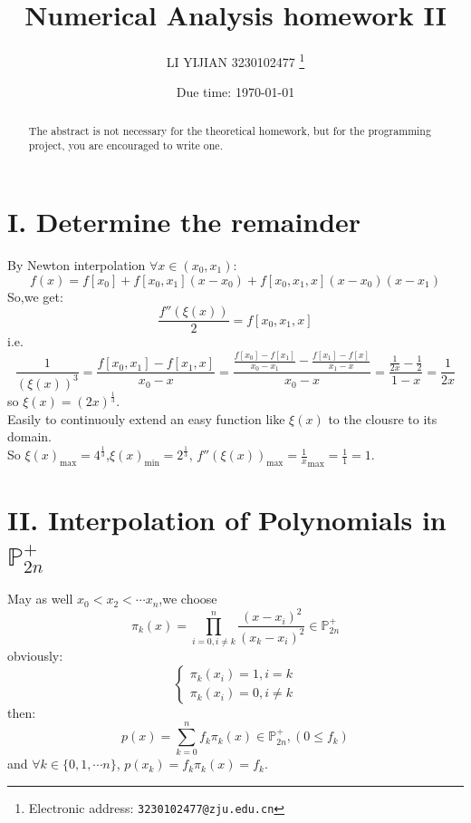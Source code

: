 \documentclass[a4paper]{article}
\begin{document}
\title{Numerical Analysis homework II}

\author{LI YIJIAN 3230102477
  \thanks{Electronic address: \texttt{3230102477@zju.edu.cn}}}


\date{Due time: \today}

\maketitle

\begin{abstract}
    The abstract is not necessary for the theoretical homework, 
    but for the programming project, 
    you are encouraged to write one.      
\end{abstract}





\section*{I. Determine the remainder}
By Newton interpolation $\forall x \in (x_0,x_1)$:
\[
f(x) = f[x_0] + f[x_0,x_1](x-x_0) + f[x_0,x_1,x](x-x_0)(x-x_1)
\]
So,we get:
\[
\frac{f''(\xi(x))}{2} = f[x_0,x_1,x]
\]
i.e.
\[
\frac{1}{(\xi(x))^3} = \frac{f[x_0,x_1] - f[x_1,x]}{x_0 - x} = 
\frac{\frac{f[x_0] - f[x_1]}{x_0 - x_1}-\frac{f[x_1] - f[x]}{x_1 - x}}{{x_0 - x}}
=\frac{ \frac{1}{2x}-\frac{1}{2}}{1-x} = \frac{1}{2x}
\]
so $\xi(x) = (2x)^{\frac{1}{3}}$.\\
Easily to continuouly extend an easy function like $\xi(x)$ to the clousre to its domain.
\\
So $\xi(x)_{\max} = 4^{\frac{1}{3}}$,$\xi(x)_{\min} = 2^{\frac{1}{3}}$,
$f''(\xi(x))_{\max} = \frac{1}{x}_{\max} = \frac{1}{1}=1$.


\section*{II. Interpolation of Polynomials in $\mathbb{P}^{+}_{2n}$}
May as well $x_0 < x_2 < \cdots x_n$,we choose
\[
\pi_k(x) = \prod^{n}_{i=0,i\neq k} \frac{(x-x_i)^2}{(x_k - x_i)^2}\in \mathbb{P}^{+}_{2n}
\] 
obviously:\[
\begin{cases}
\pi_k(x_i) = 1 ,i = k \\
\pi_k(x_i) = 0 , i \neq k
\end{cases}
\]
then:
\[p(x) = \sum^{n}_{k = 0}f_k \pi_k(x) \in \mathbb{P}^{+}_{2n},(0 \leq f_k) \]
and $\forall k \in \{0,1,\cdots n\}$, $p(x_k) = f_k \pi_k(x) = f_k$.
\end{document}
